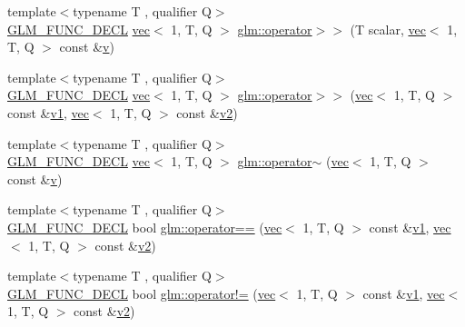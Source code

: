 \begin{DoxyCompactItemize}
\item 
{\footnotesize template$<$typename T , qualifier Q$>$ }\\\mbox{\hyperlink{setup_8hpp_ab2d052de21a70539923e9bcbf6e83a51}{G\+L\+M\+\_\+\+F\+U\+N\+C\+\_\+\+D\+E\+CL}} \mbox{\hyperlink{structglm_1_1vec}{vec}}$<$ 1, T, Q $>$ \mbox{\hyperlink{group__ext__vec1_ga41efbda33c026dd25484c09e211eb68e}{glm\+::operator$>$$>$}} (T scalar, \mbox{\hyperlink{structglm_1_1vec}{vec}}$<$ 1, T, Q $>$ const \&\mbox{\hyperlink{_s_d_l__opengl_8h_a10a82eabcb59d2fcd74acee063775f90}{v}})
\item 
{\footnotesize template$<$typename T , qualifier Q$>$ }\\\mbox{\hyperlink{setup_8hpp_ab2d052de21a70539923e9bcbf6e83a51}{G\+L\+M\+\_\+\+F\+U\+N\+C\+\_\+\+D\+E\+CL}} \mbox{\hyperlink{structglm_1_1vec}{vec}}$<$ 1, T, Q $>$ \mbox{\hyperlink{group__ext__vec1_gaf53e1d5cb9aa5de1b2a77bf40c275361}{glm\+::operator$>$$>$}} (\mbox{\hyperlink{structglm_1_1vec}{vec}}$<$ 1, T, Q $>$ const \&\mbox{\hyperlink{_s_d_l__opengl__glext_8h_a435c176a02c061b43e19bdf7c86cceae}{v1}}, \mbox{\hyperlink{structglm_1_1vec}{vec}}$<$ 1, T, Q $>$ const \&\mbox{\hyperlink{_s_d_l__opengl__glext_8h_a0928f6d0f0f794ba000a21dfae422136}{v2}})
\item 
{\footnotesize template$<$typename T , qualifier Q$>$ }\\\mbox{\hyperlink{setup_8hpp_ab2d052de21a70539923e9bcbf6e83a51}{G\+L\+M\+\_\+\+F\+U\+N\+C\+\_\+\+D\+E\+CL}} \mbox{\hyperlink{structglm_1_1vec}{vec}}$<$ 1, T, Q $>$ \mbox{\hyperlink{group__ext__vec1_ga923256ef3abbc940c475ddb5e2bca75b}{glm\+::operator$\sim$}} (\mbox{\hyperlink{structglm_1_1vec}{vec}}$<$ 1, T, Q $>$ const \&\mbox{\hyperlink{_s_d_l__opengl_8h_a10a82eabcb59d2fcd74acee063775f90}{v}})
\item 
{\footnotesize template$<$typename T , qualifier Q$>$ }\\\mbox{\hyperlink{setup_8hpp_ab2d052de21a70539923e9bcbf6e83a51}{G\+L\+M\+\_\+\+F\+U\+N\+C\+\_\+\+D\+E\+CL}} bool \mbox{\hyperlink{group__ext__vec1_gaa9cd0f18629236bade24765fd5d2616b}{glm\+::operator==}} (\mbox{\hyperlink{structglm_1_1vec}{vec}}$<$ 1, T, Q $>$ const \&\mbox{\hyperlink{_s_d_l__opengl__glext_8h_a435c176a02c061b43e19bdf7c86cceae}{v1}}, \mbox{\hyperlink{structglm_1_1vec}{vec}}$<$ 1, T, Q $>$ const \&\mbox{\hyperlink{_s_d_l__opengl__glext_8h_a0928f6d0f0f794ba000a21dfae422136}{v2}})
\item 
{\footnotesize template$<$typename T , qualifier Q$>$ }\\\mbox{\hyperlink{setup_8hpp_ab2d052de21a70539923e9bcbf6e83a51}{G\+L\+M\+\_\+\+F\+U\+N\+C\+\_\+\+D\+E\+CL}} bool \mbox{\hyperlink{group__ext__vec1_gadc81ac3efb2cc1678cb7ebe126d2e26d}{glm\+::operator!=}} (\mbox{\hyperlink{structglm_1_1vec}{vec}}$<$ 1, T, Q $>$ const \&\mbox{\hyperlink{_s_d_l__opengl__glext_8h_a435c176a02c061b43e19bdf7c86cceae}{v1}}, \mbox{\hyperlink{structglm_1_1vec}{vec}}$<$ 1, T, Q $>$ const \&\mbox{\hyperlink{_s_d_l__opengl__glext_8h_a0928f6d0f0f794ba000a21dfae422136}{v2}})

\end{DoxyCompactItemize}
